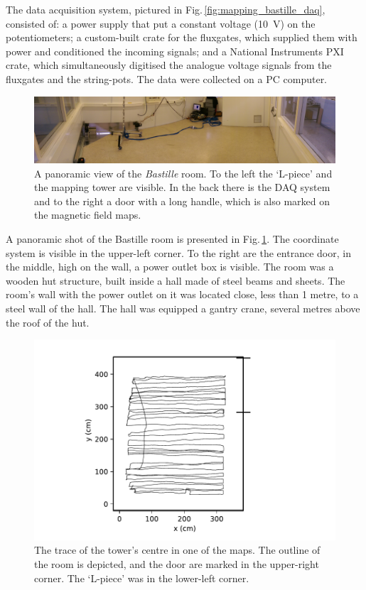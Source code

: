 The data acquisition system, pictured in Fig.\,\ref{fig:mapping_bastille_daq}, consisted of: a power supply that put a constant voltage (\SI{10}{\volt}) on the potentiometers; a custom-built crate for the fluxgates, which supplied them with power and conditioned the incoming signals; and a National Instruments PXI crate, which simultaneously digitised the analogue voltage signals from the fluxgates and the string-pots. The data were collected on a PC computer.

\begin{figure}
  \centering
  \includegraphics[width=\linewidth]{gfx/mapping/lpsc/bastille_panorama.jpeg}
  \caption{A panoramic view of the \emph{Bastille} room. To the left the `L-piece' and the mapping tower are visible. In the back there is the DAQ system and to the right a door with a long handle, which is also marked on the magnetic field maps.}\label{fig:mapping_bastille_panorama}
\end{figure}

A panoramic shot of the Bastille room is presented in Fig.\,\ref{fig:mapping_bastille_panorama}. The coordinate system is visible in the upper-left corner. To the right are the entrance door, in the middle, high on the wall, a power outlet box is visible.
The room was a wooden hut structure, built inside a hall made of steel beams and sheets. The room's wall with the power outlet on it was located close, less than 1 metre, to a steel wall of the hall. The hall was equipped a gantry crane, several metres above the roof of the hut.

\begin{figure}
  \centering
  \includegraphics[width=0.5\linewidth]{gfx/mapping/lpsc/bastille_crane_away_rep_track_crop.pdf}
  \caption{The trace of the tower's centre in one of the maps. The outline of the room is depicted, and the door are marked in the upper-right corner. The `L-piece' was in the lower-left corner.}\label{fig:mapping_bastille_track}
\end{figure}

